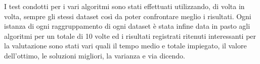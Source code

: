 \documentclass[preprint,12pt]{elsarticle}
\begin{document}
I test condotti per i vari algoritmi sono stati effettuati utilizzando, di volta in volta, sempre gli stessi dataset così da poter confrontare meglio i risultati. Ogni istanza di ogni raggruppamento di ogni dataset è stata infine data in pasto agli algoritmi per un totale di 10 volte ed i risultati registrati ritenuti interessanti per la valutazione sono stati vari quali il tempo medio e totale impiegato, il valore dell'ottimo, le soluzioni migliori, la varianza e via dicendo.

 %
\end{document}
